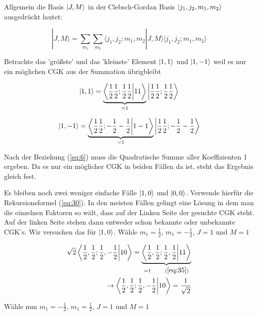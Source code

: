 Allgemein die Basis \(\left| J,M \right\rangle\) in der Clebsch-Gordan Basis \(\left| j_1,j_2,m_1,m_2 \right\rangle\) ausgedrückt lautet:


\begin{equation}
  \label{eq:33}
  |J,M\rangle = \sum_{m_1}\sum_{m_2}\langle j_1,j_2;m_1,m_2|J,M\rangle |j_1,j_2;m_1,m_2\rangle
\end{equation}


Betrachte das 'größste' und das 'kleinste' Element \(\left| 1,1 \right\rangle\) und \(\left| 1,-1 \right\rangle\) weil es nur ein möglichen CGK aus der Summation übrigbleibt


\begin{equation}
  \label{eq:35}
  \ket{1,1} =\underbrace{ \braket{ \frac{1}{2}\frac{1}{2};\frac{1}{2}\frac{1}{2} }{11} }_{=1} \ket{ \frac{1}{2}\frac{1}{2};  \frac{1}{2} \frac{1}{2}}
\end{equation}

\begin{equation}
  \label{eq:36}
    \ket{1,-1} =\underbrace{ \braket{ \frac{1}{2}\frac{1}{2};-\frac{1}{2}-\frac{1}{2} }{1-1} }_{=1} \ket{ \frac{1}{2}\frac{1}{2};  -\frac{1}{2} -\frac{1}{2}}
\end{equation}



Nach der Beziehung (\ref{eq:6}) muss die Quadratische Summe aller Koeffizienten 1 ergeben. Da es nur ein möglicher CGK in beiden Fällen da ist, steht das Ergebnis gleich fest. 

Es bleiben noch zwei weniger einfache Fälle \(\left| 1,0 \right\rangle\) und \(\left| 0,0 \right\rangle\). Verwende hierfür die Rekursionsformel (\ref{eq:30}). In den meisten Fällen gelingt eine Lösung in dem man die einzelnen Faktoren so wält, dass auf der Linken Seite der gesuchte CGK steht. Auf der linken Seite stehen dann entweder schon bekannte oder unbekannte CGK's. Wir versuchen das für \(\left| 1,0 \right\rangle\). Wähle \(m_1=\frac{1}{2}\), \(m_1=-\frac{1}{2}\), \(J=1\) und \(M=1\)

\begin{align}
  \label{eq:34}
  \sqrt{2}\braket{\frac{1}{2},\frac{1}{2};\frac{1}{2},-\frac{1}{2}}{10}= \underbr{ \braket{\frac{1}{2},\frac{1}{2};\frac{1}{2},\frac{1}{2}}{11}}_{=1 \qquad (\ref{eq:35})}  \\
\rightarrow \braket{\frac{1}{2},\frac{1}{2};\frac{1}{2},-\frac{1}{2}}{10}=\frac{1}{\sqrt{2}}
\end{align}

Wähle nun \(m_1=-\frac{1}{2}\), \(m_1=\frac{1}{2}\), \(J=1\) und \(M=1\)




